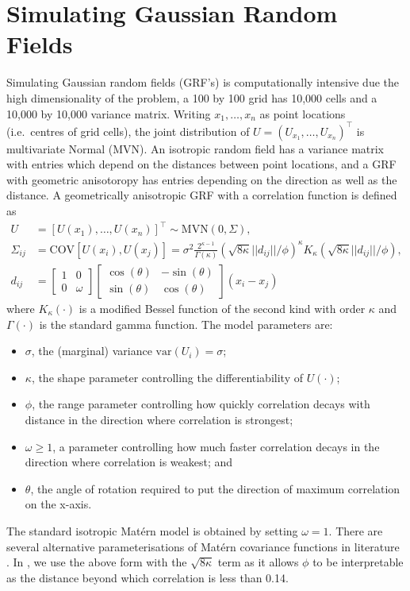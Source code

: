 \documentclass[article,nojss]{jss}\usepackage[]{graphicx}\usepackage[]{color}
\def\cov{{\text{COV}}}
\def\var{{\text{var}}}
\begin{document}
\section{Simulating Gaussian Random Fields} 

Simulating Gaussian random fields (GRF's) is computationally intensive due the high dimensionality of the problem, a 100 by 100 grid has 10,000 cells and a 10,000 by 10,000 variance matrix.  Writing $x_1,\dots, x_n$ as point locations (i.e.\ centres of grid cells), the joint distribution of $U=(U_{x_1},\dots,U_{x_n})^\top$ is multivariate Normal (MVN).  An isotropic random field has a variance matrix  with entries which depend on the distances between point locations, and a GRF with geometric anisotoropy has entries depending on the direction as well as the distance.  
A geometrically anisotropic GRF with a \citet{matern1960spatial} correlation function is defined as
\begin{align*}
U &= [U(x_1), \ldots, U(x_n)]^\top \sim \text{MVN}(0, \Sigma), \\
\Sigma_{ij} &= \cov[ U(x_i),U(x_j) ]= \sigma^2 \frac{2^{\kappa-1}}{\Gamma(\kappa)} \left(\sqrt{8\kappa} ||d_{ij}||/\phi \right)^\kappa  K_\kappa\left(\sqrt{8\kappa} ||d_{ij}||/\phi \right),\\
d_{ij} &= 
        \left[
          \begin{array}{rr}
            1 & 0 \\
            0 & \omega
          \end{array}
        \right]
        \left[
          \begin{array}{rr}
            \cos(\theta) & -\sin(\theta) \\
            \sin(\theta) & \cos(\theta)
          \end{array}
        \right]
(x_i - x_j)
\end{align*}
where $K_\kappa(\cdot)$  is a modified Bessel function of the second kind with order $\kappa$ and $\Gamma(\cdot)$ is the standard gamma function.  The model parameters are:
\begin{itemize}
\setlength{\parskip}{0pt}
\item $\sigma$, the (marginal) variance  $\var(U_i) = \sigma$;
\item $\kappa$, the shape parameter controlling the differentiability of $U(\cdot)$;
\item $\phi$, the range parameter controlling how quickly correlation decays with distance in the direction where correlation is strongest;
\item $\omega \geq 1$, a parameter controlling how much faster correlation decays in the direction where correlation is weakest; and 
\item $\theta$, the angle of rotation  required to put the direction of maximum correlation on the x-axis.
\end{itemize}
The standard isotropic Mat\'ern model is obtained by setting $\omega = 1$.
There are several alternative parameterisations of Mat\'ern covariance functions in literature  \citep[see][]{haskard2007anisotropic}. In , we use the above form with the $\sqrt{8\kappa}$ term as it allows $\phi$ to be interpretable as the distance beyond which correlation is less than 0.14.
\end{document}
